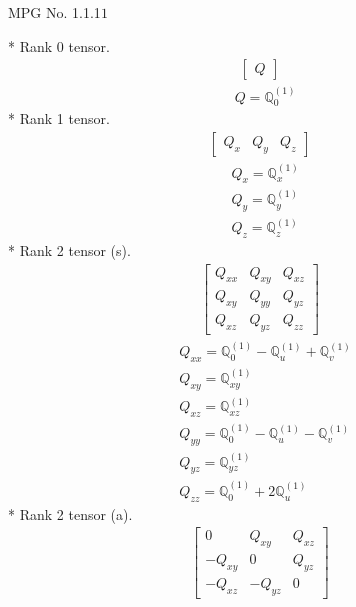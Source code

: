 \documentclass[fleqn,8pt,landscape]{jsarticle}
\begin{document}
\setcounter{MaxMatrixCols}{32}

\renewcommand{\tablename}{Table~}
\renewcommand{\figurename}{Figure~}
\begin{center}
\LARGE
MPG No. 1.1.1\quad$1$
\end{center}
* Rank 0 tensor.
\begin{align*}
\begin{bmatrix} Q \end{bmatrix}
\end{align*}
\begin{align*}
& Q = \mathbb{Q}_{0}^{(1)}
\end{align*}
* Rank 1 tensor.
\begin{align*}
\begin{bmatrix} Q_{x} & Q_{y} & Q_{z} \end{bmatrix}
\end{align*}
\begin{align*}
& Q_{x} = \mathbb{Q}_{x}^{(1)} \\
& Q_{y} = \mathbb{Q}_{y}^{(1)} \\
& Q_{z} = \mathbb{Q}_{z}^{(1)}
\end{align*}
* Rank 2 tensor (s).
\begin{align*}
\begin{bmatrix} Q_{xx} & Q_{xy} & Q_{xz} \\ Q_{xy} & Q_{yy} & Q_{yz} \\ Q_{xz} & Q_{yz} & Q_{zz} \end{bmatrix}
\end{align*}
\begin{align*}
& Q_{xx} = \mathbb{Q}_{0}^{(1)} - \mathbb{Q}_{u}^{(1)} + \mathbb{Q}_{v}^{(1)} \\
& Q_{xy} = \mathbb{Q}_{xy}^{(1)} \\
& Q_{xz} = \mathbb{Q}_{xz}^{(1)} \\
& Q_{yy} = \mathbb{Q}_{0}^{(1)} - \mathbb{Q}_{u}^{(1)} - \mathbb{Q}_{v}^{(1)} \\
& Q_{yz} = \mathbb{Q}_{yz}^{(1)} \\
& Q_{zz} = \mathbb{Q}_{0}^{(1)} + 2 \mathbb{Q}_{u}^{(1)}
\end{align*}
* Rank 2 tensor (a).
\begin{align*}
\begin{bmatrix} 0 & Q_{xy} & Q_{xz} \\ - Q_{xy} & 0 & Q_{yz} \\ - Q_{xz} & - Q_{yz} & 0 \end{bmatrix}
\end{align*}
\end{document}

